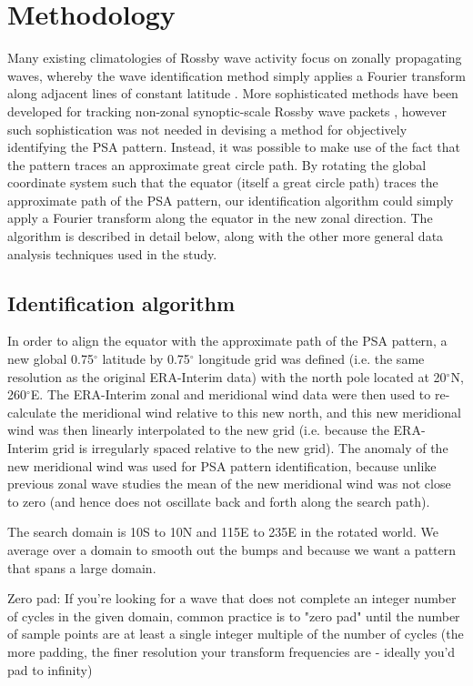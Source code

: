\section{Methodology}

Many existing climatologies of Rossby wave activity focus on zonally propagating waves, whereby the wave identification method simply applies a Fourier transform along adjacent lines of constant latitude \citep[e.g.][]{Glatt2014,IrvingSimmonds2015}. More sophisticated methods have been developed for tracking non-zonal synoptic-scale Rossby wave packets \citep[e.g.][]{Zimin2006,Souders2014}, however such sophistication was not needed in devising a method for objectively identifying the PSA pattern. Instead, it was possible to make use of the fact that the pattern traces an approximate great circle path. By rotating the global coordinate system such that the equator (itself a great circle path) traces the approximate path of the PSA pattern, our identification algorithm could simply apply a Fourier transform along the equator in the new zonal direction. The algorithm is described in detail below, along with the other more general data analysis techniques used in the study.

\subsection{Identification algorithm}

In order to align the equator with the approximate path of the PSA pattern, a new global 0.75$^{\circ}$ latitude by 0.75$^{\circ}$ longitude grid was defined (i.e. the same resolution as the original ERA-Interim data) with the north pole located at 20$^{\circ}$N, 260$^{\circ}$E. The ERA-Interim zonal and meridional wind data were then used to re-calculate the meridional wind relative to this new north, and this new meridional wind was then linearly interpolated to the new grid (i.e. because the ERA-Interim grid is irregularly spaced relative to the new grid). The anomaly of the new meridional wind was used for PSA pattern identification, because unlike previous zonal wave studies \citep[e.g.][]{IrvingSimmonds2015} the mean of the new meridional wind was not close to zero (and hence does not oscillate back and forth along the search path).

The search domain is 10S to 10N and 115E to 235E in the rotated world. We average over a domain to smooth out the bumps and because we want a pattern that spans a large domain.

Zero pad: If you're looking for a wave that does not complete an integer number of cycles in the given domain, common practice is to "zero pad" until the number of sample points are at least a single integer multiple of the number of cycles (the more padding, the finer resolution your transform frequencies are - ideally you'd pad to infinity)

